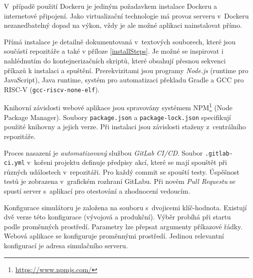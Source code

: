 V~případě použití Dockeru je jediným požadavkem instalace Dockeru a internetové připojení.
Jako virtualizační technologie má provoz serveru v~Dockeru nezanedbatelný dopad na výkon, vždy je ale možné aplikaci nainstalovat přímo.

Přímá instalace je detailně dokumentovaná v~textových souborech, které jsou součástí repozitáře a také v příloze \ref{installSteps}.
Je možné se inspirovat i nahlédnutím do kontejnerizačních skriptů, které obsahují přesnou sekvenci příkazů k instalaci a spuštění.
Prerekvizitami jsou programy \emph{Node.js} (runtime pro JavaScript), Java runtime, systém pro automatizaci překladu Gradle a GCC pro RISC-V (\texttt{gcc-riscv-none-elf}).

Knihovní závislosti webové aplikace jsou spravovány systémem NPM\footnote{\url{https://www.npmjs.com/}} (Node Package Manager).
Soubory \texttt{package.json} a \texttt{package-lock.json} specifikují použité knihovny a jejich verze.
Při instalaci jsou závislosti staženy z~centrálního repozitáře.

Proces nasazení je \emph{automatizovaný} službou \emph{GitLab CI/CD}.
Soubor \texttt{.gitlab-ci.yml} v~kořeni projektu definuje předpisy akcí, které se mají spouštět při různých událostech v~repozitáři.
Pro každý commit se spouští testy.
Úspěšnost testů je zobrazena v~grafickém rozhraní GitLabu.
Při novém \emph{Pull Requestu} se spustí server s~aplikací pro otestování a zhodnocení vedoucím.

Konfigurace simulátoru je založena na souboru s~dvojicemi klíč-hodnota.
Existují dvě verze této konfigurace (vývojová a produkční).
Výběr probíhá při startu podle proměnných prostředí.
Parametry lze přepsat argumenty příkazové řádky.
Webová aplikace se konfiguruje proměnnými prostředí.
Jedinou relevantní konfigurací je adresa simulačního serveru.
